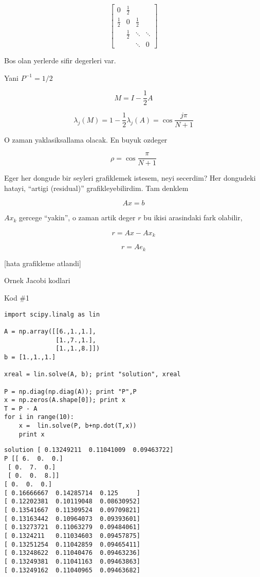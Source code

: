 \documentclass[12pt,fleqn]{article}\usepackage{../common}
\begin{document}
\[ 
\left[\begin{array}{rrrr}
0 & \frac{ 1}{2} & & \\
\frac{ 1}{2} & 0 & \frac{ 1}{2}& \\
 & \frac{ 1}{2} & \ddots & \ddots \\
 && \ddots & 0
\end{array}\right]
 \]

Bos olan yerlerde sifir degerleri var. 

Yani $P^{-1} = 1/2$

\[ M = I-\frac{ 1}{2}A  \]

\[ \lambda_j(M) = 1 - \frac{ 1}{2}\lambda_j(A) = \cos \frac{ j\pi}{N+1}\]

O zaman yaklasiksallama olacak. En buyuk ozdeger

\[ \rho = \cos \frac{ \pi}{N+1} \]

Eger her dongude bir seyleri grafiklemek istesem, neyi secerdim? Her
dongudeki hatayi, ``artigi (residual)'' grafikleyebilirdim. Tam denklem

\[ Ax = b \]

$Ax_k$ gercege ``yakin'', o zaman artik deger $r$ bu ikisi arasindaki fark
olabilir, 

\[ r = Ax - Ax_k \]

\[ r = Ae_k \]

[hata grafikleme atlandi]

Ornek Jacobi kodlari

Kod \#1

\begin{verbatim}
import scipy.linalg as lin

A = np.array([[6.,1.,1.],
              [1.,7.,1.],
              [1.,1.,8.]])
b = [1.,1.,1.]

xreal = lin.solve(A, b); print "solution", xreal

P = np.diag(np.diag(A)); print "P",P
x = np.zeros(A.shape[0]); print x
T = P - A
for i in range(10):
    x =  lin.solve(P, b+np.dot(T,x))
    print x
\end{verbatim}

\begin{verbatim}
solution [ 0.13249211  0.11041009  0.09463722]
P [[ 6.  0.  0.]
 [ 0.  7.  0.]
 [ 0.  0.  8.]]
[ 0.  0.  0.]
[ 0.16666667  0.14285714  0.125     ]
[ 0.12202381  0.10119048  0.08630952]
[ 0.13541667  0.11309524  0.09709821]
[ 0.13163442  0.10964073  0.09393601]
[ 0.13273721  0.11063279  0.09484061]
[ 0.1324211   0.11034603  0.09457875]
[ 0.13251254  0.11042859  0.09465411]
[ 0.13248622  0.11040476  0.09463236]
[ 0.13249381  0.11041163  0.09463863]
[ 0.13249162  0.11040965  0.09463682]
\end{verbatim}
\end{document}
